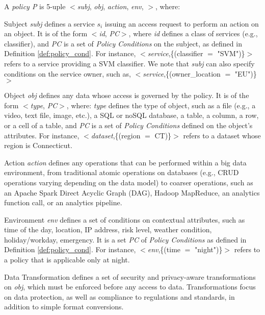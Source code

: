 \begin{definition}[Policy]\label{def:policy_rule}
  A {\it policy P} is 5-uple $<$\textit{subj}, \textit{obj}, \textit{action}, \textit{env}, \textit{\TP}$>$, where:
  \begin{description}
    \item Subject \textit{subj} defines a service $s_i$ issuing an access request to perform an action on an object. It is of the form $<$\emph{id}, \emph{PC}$>$, where \emph{id} defines a class of services (e.g., classifier), and \emph{PC} is a set of \emph{Policy Conditions} on the subject, as defined in Definition \ref{def:policy_cond}. For instance, $<$\emph{service},\{(classifier $=$ "SVM")\}$>$ refers to a service providing a SVM classifier. We note that \textit{subj} can also specify conditions on the service owner, such as, $<$\emph{service},\{(owner\_location $=$ "EU")\}$>$

    \item Object \textit{obj} defines any data whose access is governed by the policy. It is of the form $<$\emph{type}, \emph{PC}$>$, where: \emph{type} defines the type of object, such as a file (e.g., a video, text file, image, etc.), a SQL or noSQL database, a table, a column, a row, or a cell of a table, and \emph{PC} is a set of \emph{Policy Conditions} defined on the object's attributes. For instance, $<$\emph{dataset},\{(region $=$ CT)\}$>$ refers to a dataset whose region is Connecticut.

    \item Action \textit{action} defines any operations that can be performed within a big data environment, from traditional atomic operations on databases (e.g., CRUD operations varying depending on the data model) to coarser operations, such as an Apache Spark Direct Acyclic Graph (DAG), Hadoop MapReduce, an analytics function call, or an analytics pipeline.

    \item Environment \textit{env} defines a set of conditions on contextual attributes, such as time of the day, location, IP address, risk level, weather condition, holiday/workday, emergency. It is a set \emph{PC} of \emph{Policy Conditions} as defined in Definition \ref{def:policy_cond}. For instance, $<$\emph{env},\{(time $=$ "night")\}$>$ refers to a policy that is applicable only at night.

    \item Data Transformation \textit{\TP} defines a set of security and privacy-aware transformations on \textit{obj}, which must be enforced before any access to data. Transformations focus on data protection, as well as compliance to regulations and standards, in addition to simple format conversions. 
  \end{description}
\end{definition}

